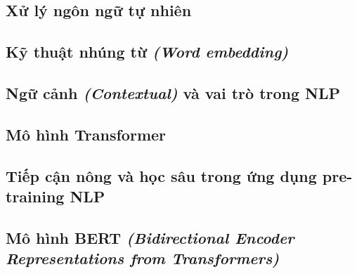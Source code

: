 \subsection{Xử lý ngôn ngữ tự nhiên}


\subsection{Kỹ thuật nhúng từ \textit{(Word embedding)}}


\subsection{Ngữ cảnh \textit{(Contextual)} và vai trò trong NLP}


\subsection{Mô hình Transformer}


\subsection{Tiếp cận nông và học sâu trong ứng dụng pre-training NLP}


\subsection{Mô hình BERT \textit{(Bidirectional Encoder Representations from Transformers)}}

